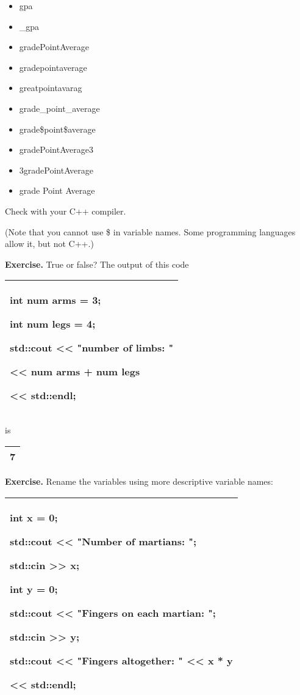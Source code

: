 \documentclass[
]{article}
\providecommand{\tightlist}{%
  \setlength{\itemsep}{0pt}\setlength{\parskip}{0pt}}
\begin{document}
\begin{itemize}
\tightlist
\item
  gpa
\item
  \_gpa
\item
  gradePointAverage
\item
  gradepointaverage
\item
  greatpointavarag
\item
  grade\_point\_average
\item
  grade\$point\$average
\item
  gradePointAverage3
\item
  3gradePointAverage
\item
  grade Point Average
\end{itemize}

Check with your C++ compiler.

(Note that you cannot use \$ in variable names. Some programming
languages allow it, but not C++.)

\textbf{Exercise.} True or false? The output of this code

\begin{longtable}[]{@{}l@{}}
\toprule
\endhead
\begin{minipage}[t]{0.97\columnwidth}\raggedright
int num arms = 3;

int num legs = 4;

std::cout \textless\textless{} "number of limbs: "

\textless\textless{} num arms + num legs

\textless\textless{} std::endl;\strut
\end{minipage}\tabularnewline
\bottomrule
\end{longtable}

is

\begin{longtable}[]{@{}l@{}}
\toprule
\endhead
7\tabularnewline
\bottomrule
\end{longtable}

\textbf{Exercise.} Rename the variables using more descriptive variable
names:

\begin{longtable}[]{@{}l@{}}
\toprule
\endhead
\begin{minipage}[t]{0.97\columnwidth}\raggedright
int x = 0;

std::cout \textless\textless{} "Number of martians: ";

std::cin \textgreater\textgreater{} x;

int y = 0;

std::cout \textless\textless{} "Fingers on each martian: ";

std::cin \textgreater\textgreater{} y;

std::cout \textless\textless{} "Fingers altogether: "
\textless\textless{} x * y

\textless\textless{} std::endl;\strut
\end{minipage}\tabularnewline
\bottomrule
\end{longtable}
\end{document}
